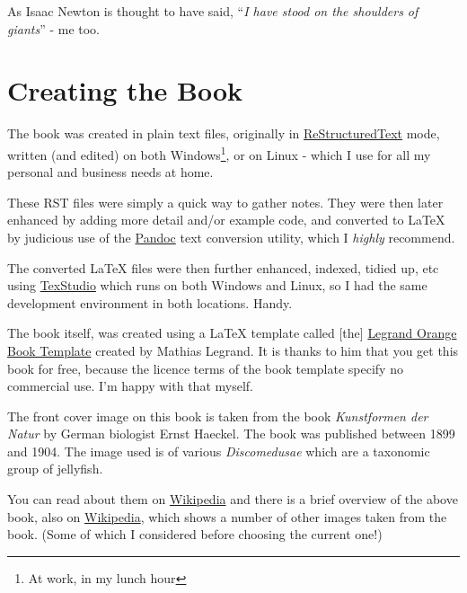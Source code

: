 \begin{appendix}
As Isaac Newton is thought to have said, ``\emph{I have stood on the shoulders of giants}'' - me too.


\section{Creating the Book}\label{creating-the-book}

The book was created in plain text files, originally in \href{https://en.wikipedia.org/wiki/ReStructuredText}{ReStructuredText} mode, written (and edited) on both Windows\footnote{At work, in my lunch hour}, or on Linux - which I use for all my personal and business needs at home.

These RST files were simply a quick way to gather notes. They were then later enhanced by adding more detail and/or example code, and converted to \LaTeX{}\program{\LaTeX{}} by judicious use of the \href{https://pandoc.org/}{Pandoc} text conversion utility, which I \emph{highly} recommend.

The converted \LaTeX{}\program{\LaTeX{}} files were then further enhanced, indexed, tidied up, etc using \href{http://www.texstudio.org/}{TexStudio} which runs on both Windows and Linux, so I had the same development environment in both locations. Handy. 

The book itself, was created using a \LaTeX{}\program{\LaTeX{}} template called [the] \href{https://www.latextemplates.com/template/the-legrand-orange-book}{Legrand Orange Book Template} created by Mathias Legrand. It is thanks to him that you get this book for free, because the licence terms of the book template specify no commercial use. I'm happy with that myself.

The front cover image on this book is taken from the book \emph{Kunstformen der Natur} by German biologist Ernst Haeckel. The book was published between 1899 and 1904. The image used is of various \emph{Discomedusae} which are a taxonomic group of jellyfish.

You can read about them on \href{https://en.wikipedia.org/wiki/Discomedusae}{Wikipedia} and there is a brief overview of the above book, also on \href{https://en.wikipedia.org/wiki/Kunstformen_der_Natur}{Wikipedia},
which shows a number of other images taken from the book. (Some of which I considered before choosing the current one!)


\end{appendix}
